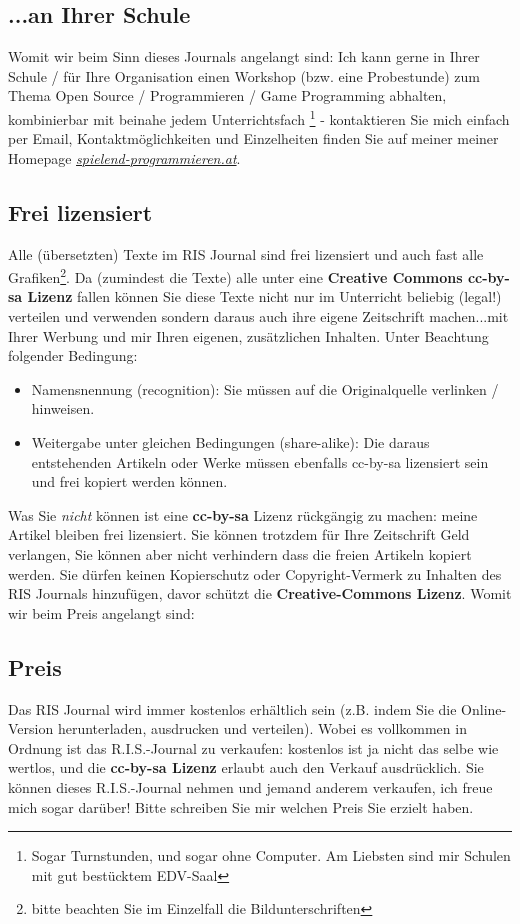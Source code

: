 \subsection*{...an Ihrer Schule}
Womit wir beim Sinn dieses Journals angelangt sind: Ich kann gerne in Ihrer Schule / für Ihre Organisation einen Workshop (bzw. eine Probestunde) zum Thema Open Source / Programmieren / Game Programming abhalten, kombinierbar mit beinahe jedem Unterrichtsfach \footnote{Sogar Turnstunden, und sogar ohne Computer. Am Liebsten sind mir Schulen mit gut bestücktem EDV-Saal} - kontaktieren Sie mich einfach per Email, Kontaktmöglichkeiten und Einzelheiten finden Sie auf meiner  meiner Homepage \href{http://spielend-programmieren.at}{\textit{spielend-programmieren.at}}.


\subsection*{Frei lizensiert}
Alle (übersetzten) Texte im RIS Journal sind frei lizensiert und auch fast alle Grafiken\footnote{bitte beachten Sie im Einzelfall die Bildunterschriften}. Da (zumindest die Texte) alle unter eine \textbf{Creative Commons cc-by-sa Lizenz} fallen können Sie diese Texte nicht nur im Unterricht beliebig (legal!) verteilen und verwenden sondern daraus auch ihre eigene Zeitschrift machen...mit Ihrer Werbung und mir Ihren eigenen, zusätzlichen Inhalten. Unter Beachtung folgender Bedingung:
\begin{itemize} 
\item Namensnennung (recognition): Sie müssen auf die Originalquelle verlinken / hinweisen. 
\item Weitergabe unter gleichen Bedingungen (share-alike): Die daraus entstehenden Artikeln oder Werke müssen ebenfalls cc-by-sa lizensiert sein und frei kopiert werden können.
\end{itemize}
Was Sie \emph{nicht} können ist eine \textbf{cc-by-sa} Lizenz rückgängig zu machen: meine Artikel bleiben frei lizensiert. Sie können trotzdem für Ihre Zeitschrift Geld verlangen, Sie können aber nicht verhindern dass die freien Artikeln kopiert werden. Sie dürfen keinen  Kopierschutz oder Copyright-Vermerk zu Inhalten des RIS Journals hinzufügen, davor schützt die \textbf{Creative-Commons Lizenz}. Womit wir beim Preis angelangt sind:

\subsection*{Preis}
Das RIS Journal wird immer kostenlos erhältlich sein (z.B. indem Sie die Online-Version herunterladen, ausdrucken und verteilen). Wobei es vollkommen in Ordnung ist das R.I.S.-Journal zu verkaufen: kostenlos ist ja nicht das selbe wie wertlos, und die \textbf{cc-by-sa Lizenz} erlaubt auch den Verkauf ausdrücklich. Sie können dieses R.I.S.-Journal nehmen und jemand anderem verkaufen, ich freue mich sogar darüber! Bitte schreiben Sie mir welchen Preis Sie erzielt haben. 

